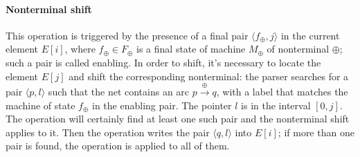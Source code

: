 \paragraph*{Nonterminal shift}
This operation is triggered by the presence of a final pair $\langle f_\oplus, j \rangle$ in the current element $E[i]$, where $f_\oplus \in F_\oplus$ is a final state of machine $M_\oplus$ of nonterminal $\oplus$;
such a pair is called enabling.
In order to shift, it's necessary to locate the element $E[j]$ and shift the corresponding nonterminal:
the parser searches for a pair $\langle p, l \rangle$ such that the net contains an arc $p \xrightarrow{\oplus} q$, with a label that matches the machine of state $f_\oplus$ in the enabling pair.
The pointer $l$ is in the interval $\left[ 0, j \right]$.
The operation will certainly find at least one such pair and the nonterminal shift applies to it.
Then the operation writes the pair $\langle q, l\rangle$ into $E[i]$; if more than one pair is found, the operation is applied to all of them.

